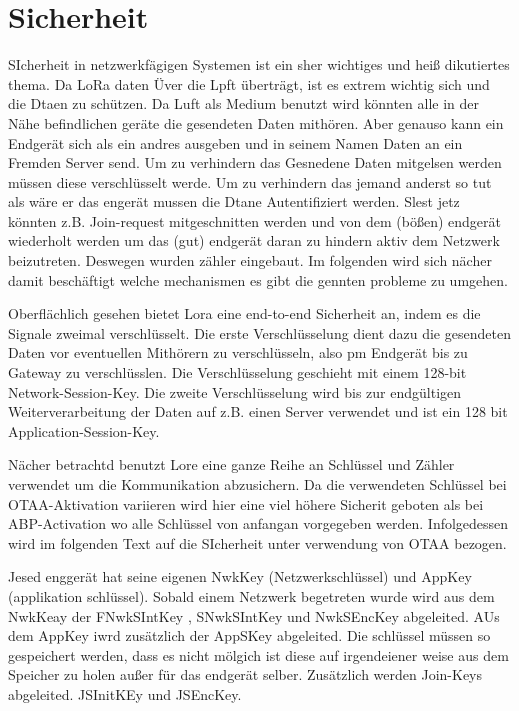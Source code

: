 \documentclass[a4paper,12pt]{article}
\begin{document}
    \section{Sicherheit} \label{sec:Sicherheit}
        SIcherheit in netzwerkfägigen Systemen ist ein sher wichtiges und heiß dikutiertes thema. Da LoRa daten Üver die Lpft überträgt, ist es extrem wichtig sich und die Dtaen zu schützen.
        Da Luft als Medium benutzt wird könnten alle in der Nähe befindlichen geräte die gesendeten Daten mithören. Aber genauso kann ein Endgerät sich als ein andres ausgeben und in seinem Namen Daten an ein
        Fremden Server send. Um zu verhindern das Gesnedene Daten mitgelsen werden müssen diese verschlüsselt werde. Um zu verhindern das jemand anderst so tut als wäre er das engerät mussen die Dtane Autentifiziert werden.
        Slest jetz könnten z.B. Join-request mitgeschnitten werden und von dem (bößen) endgerät wiederholt werden um das (gut) endgerät daran zu hindern aktiv dem Netzwerk beizutreten. Deswegen wurden zähler eingebaut. Im folgenden wird sich nächer damit beschäftigt welche mechanismen es gibt die gennten probleme zu umgehen.
        
        Oberflächlich gesehen bietet Lora eine end-to-end Sicherheit an, indem es die Signale zweimal verschlüsselt.
        Die erste Verschlüsselung dient dazu die gesendeten Daten vor eventuellen Mithörern zu verschlüsseln, also pm Endgerät bis zu Gateway zu verschlüsslen. Die Verschlüsselung geschieht mit einem 128-bit Network-Session-Key.
        Die zweite Verschlüsselung wird bis zur endgültigen Weiterverarbeitung der Daten auf z.B. einen Server verwendet und ist ein 128 bit Application-Session-Key.

        Nächer betrachtd benutzt Lore eine ganze Reihe an Schlüssel und Zähler verwendet um die Kommunikation abzusichern. Da die verwendeten Schlüssel bei OTAA-Aktivation variieren wird hier eine viel höhere Sicherit geboten als bei ABP-Activation wo alle Schlüssel von anfangan vorgegeben werden.
        Infolgedessen wird im folgenden Text auf die SIcherheit unter verwendung von OTAA bezogen.

        Jesed enggerät hat seine eigenen NwkKey (Netzwerkschlüssel) und AppKey (applikation schlüssel). Sobald einem Netzwerk begetreten wurde wird aus dem NwkKeay der FNwkSIntKey , SNwkSIntKey und NwkSEncKey
        abgeleited. AUs dem AppKey iwrd zusätzlich der AppSKey abgeleited. Die schlüssel müssen so gespeichert werden, dass es nicht mölgich ist diese auf irgendeiener weise aus dem Speicher zu holen außer für das endgerät selber.
        Zusätzlich werden Join-Keys abgeleited. JSInitKEy und JSEncKey.
\end{document}

